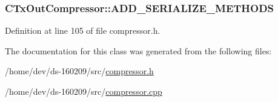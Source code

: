 \subsubsection[{A\+D\+D\+\_\+\+S\+E\+R\+I\+A\+L\+I\+Z\+E\+\_\+\+M\+E\+T\+H\+O\+D\+S}]{\setlength{\rightskip}{0pt plus 5cm}C\+Tx\+Out\+Compressor\+::\+A\+D\+D\+\_\+\+S\+E\+R\+I\+A\+L\+I\+Z\+E\+\_\+\+M\+E\+T\+H\+O\+D\+S}\label{class_c_tx_out_compressor_a520b323886560ededcfe303c4672481e}


Definition at line 105 of file compressor.\+h.



The documentation for this class was generated from the following files\+:\begin{DoxyCompactItemize}
\item 
/home/dev/ds-\/160209/src/\hyperlink{compressor_8h}{compressor.\+h}\item 
/home/dev/ds-\/160209/src/\hyperlink{compressor_8cpp}{compressor.\+cpp}\end{DoxyCompactItemize}
